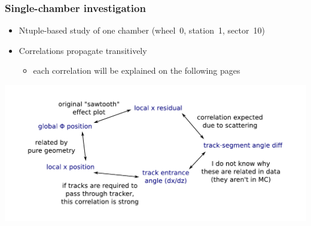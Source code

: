 \documentclass[compress]{beamer}
\begin{document}
\begin{frame}
\frametitle{Single-chamber investigation}

\vspace{0.25 cm}
\begin{itemize}
\item Ntuple-based study of one chamber (wheel~0, station~1, sector~10)
\item Correlations propagate transitively
\begin{itemize}
\item each correlation will be explained on the following pages
\end{itemize}
\end{itemize}

\mbox{\hspace{-1 cm}}\includegraphics[width=1.2\linewidth]{map_of_correlations.pdf}
\end{frame}
\end{document}

